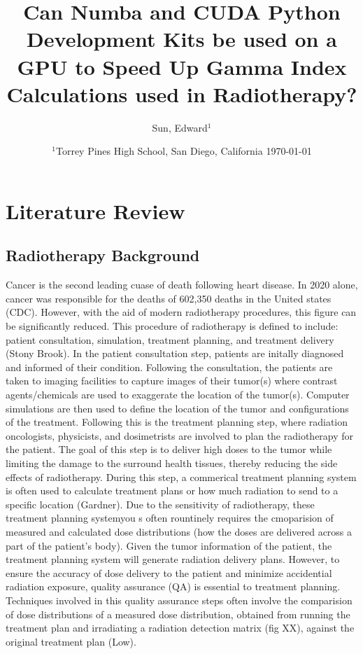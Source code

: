 \documentclass[12pt]{article}
\author{
  Sun, Edward$^{1}$
}
\date{%
  $^{1}$Torrey Pines High School, San Diego, California
  \today
}
\begin{document}
\title{Can Numba and CUDA Python Development Kits be used on a GPU to Speed Up Gamma Index Calculations used in Radiotherapy?}
\maketitle

\section{Literature Review}
\subsection{Radiotherapy Background}
Cancer is the second leading cuase of death following heart disease. In 2020 alone, cancer was responsible for the deaths of 602,350 deaths in the United states (CDC). However, with the aid of modern radiotherapy procedures, this figure can be significantly reduced. This procedure of radiotherapy is defined to include: patient consultation, simulation, treatment planning, and treatment delivery (Stony Brook). In the patient consultation step, patients are initally diagnosed and informed of their condition. Following the consultation, the patients are taken to imaging facilities to capture images of their tumor(s) where contrast agents/chemicals are used to exaggerate the location of the tumor(s). Computer simulations are then used to define the location of the tumor and configurations of the treatment. Following this is the treatment planning step, where radiation oncologists, physicists, and dosimetrists are involved to plan the radiotherapy for the patient. The goal of this step is to deliver high doses to the tumor while limiting the damage to the surround health tissues, thereby reducing the side effects of radiotherapy. During this step, a commerical treatment planning system is often used to calculate treatment plans or how much radiation to send to a specific location (Gardner). Due to the sensitivity of radiotherapy, these treatment planning systemyou s often rountinely requires the cmoparision of measured and calculated dose distributions (how the doses are delivered across a part of the patient's body). Given the tumor information of the patient, the treatment planning system will generate radiation delivery plans. However, to ensure the accuracy of dose delivery to the patient and minimize accidential radiation exposure, quality assurance (QA) is essential to treatment planning. Techniques involved in this quality assurance steps often involve the comparision of dose distributions of a measured dose distribution, obtained from running the treatment plan and irradiating a radiation detection matrix (fig XX), against the original treatment plan (Low).
\end{document}
